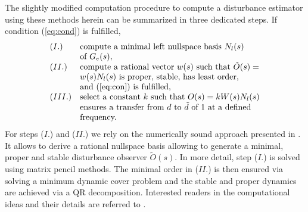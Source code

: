 \documentclass[graybox]{svmult}
\begin{document}
The slightly modified computation procedure to compute a disturbance estimator  using these methods herein can be summarized in three dedicated steps. If condition (\ref{eq:cond})  is fulfilled, 
\begin{equation*}
	\begin{array}{ll}
		(I.) & \text{compute a minimal left nullspace basis } N_l(s)  \\
		&  \text{of } G_e(s), \\
		(II.) & \text{compute a rational vector } w(s) \text{ such that } \tilde O(s)= \\
		&  w(s) N_l(s) \text{ is proper, stable, has least order, } \\
		&   \text{and (\ref{eq:con}) is fulfilled,} \\
		(III.) & \text{select a constant } k \text{ such that }   O(s) = k W(s) N_l(s)  \\ 
		&  \text{ensures a transfer from } d \text{ to } \tilde d \text{ of } 1 \text{ at a defined} \\ & \text{frequency.}\\
	\end{array}
\end{equation*}
For steps ($I$.) and ($II$.) we rely on the numerically sound approach presented in \cite{varga06}. It allows to derive a  rational nullspace basis allowing to generate a minimal, proper and stable disturbance observer $\tilde O(s)$. In more detail, step ($I$.) is solved using matrix pencil methods. The minimal order in ($II$.) is then ensured via solving a minimum dynamic cover problem and the stable and proper dynamics are achieved via a QR decomposition. Interested readers in the computational ideas and their details are referred to \cite{Varga17}.
\end{document}
